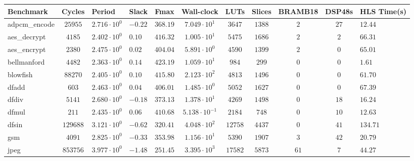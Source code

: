 \begin{tabular}{|l|c|HHc|c|c|c|c|cH|}
\hline
Benchmark     & Cycles       & Period                 & Slack     & Fmax       & Wall-clock              & LUTs      & Slices    & BRAMB18 & DSP48s  & HLS Time(s) \\
\hline
adpcm\_encode & $ 25955    $ & $ 2.716 \cdot 10^{0} $ & $ -0.22 $ & $ 368.19 $ & $ 7.049 \cdot 10^{1}  $ & $ 3647  $ & $ 1388  $ & $ 2   $ & $ 27  $ & $ 12.44   $ \\
aes\_decrypt  & $ 4185     $ & $ 2.402 \cdot 10^{0} $ & $ 0.10  $ & $ 416.32 $ & $ 1.005 \cdot 10^{1}  $ & $ 5475  $ & $ 1686  $ & $ 2   $ & $ 2   $ & $ 66.31   $ \\
aes\_encrypt  & $ 2380     $ & $ 2.475 \cdot 10^{0} $ & $ 0.02  $ & $ 404.04 $ & $ 5.891 \cdot 10^{0}  $ & $ 4590  $ & $ 1399  $ & $ 2   $ & $ 0   $ & $ 65.01   $ \\
bellmanford   & $ 4482     $ & $ 2.363 \cdot 10^{0} $ & $ 0.14  $ & $ 423.19 $ & $ 1.059 \cdot 10^{1}  $ & $ 984   $ & $ 299   $ & $ 0   $ & $ 0   $ & $ 1.61    $ \\
blowfish      & $ 88270    $ & $ 2.405 \cdot 10^{0} $ & $ 0.10  $ & $ 415.80 $ & $ 2.123 \cdot 10^{2}  $ & $ 4813  $ & $ 1496  $ & $ 0   $ & $ 0   $ & $ 61.70   $ \\
dfadd         & $ 603      $ & $ 2.463 \cdot 10^{0} $ & $ 0.04  $ & $ 406.01 $ & $ 1.485 \cdot 10^{0}  $ & $ 5052  $ & $ 1627  $ & $ 0   $ & $ 0   $ & $ 67.39   $ \\
dfdiv         & $ 5141     $ & $ 2.680 \cdot 10^{0} $ & $ -0.18 $ & $ 373.13 $ & $ 1.378 \cdot 10^{1}  $ & $ 4269  $ & $ 1498  $ & $ 0   $ & $ 18  $ & $ 16.24   $ \\
dfmul         & $ 211      $ & $ 2.435 \cdot 10^{0} $ & $ 0.06  $ & $ 410.68 $ & $ 5.138 \cdot 10^{-1} $ & $ 2184  $ & $ 748   $ & $ 0   $ & $ 10  $ & $ 12.63   $ \\
dfsin         & $ 129688   $ & $ 3.121 \cdot 10^{0} $ & $ -0.62 $ & $ 320.41 $ & $ 4.048 \cdot 10^{2}  $ & $ 12758 $ & $ 4437  $ & $ 0   $ & $ 41  $ & $ 134.71  $ \\
gsm           & $ 4091     $ & $ 2.825 \cdot 10^{0} $ & $ -0.33 $ & $ 353.98 $ & $ 1.156 \cdot 10^{1}  $ & $ 5390  $ & $ 1907  $ & $ 3   $ & $ 42  $ & $ 20.79   $ \\
jpeg          & $ 853756   $ & $ 3.977 \cdot 10^{0} $ & $ -1.48 $ & $ 251.45 $ & $ 3.395 \cdot 10^{3}  $ & $ 17582 $ & $ 5873  $ & $ 61  $ & $ 7   $ & $ 44.27   $ \\

\end{tabular}
